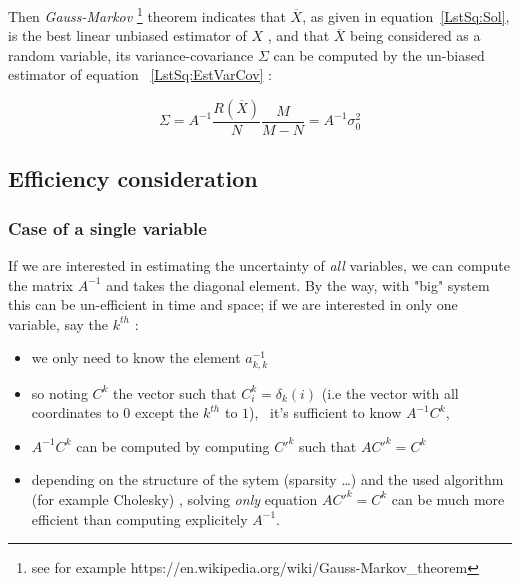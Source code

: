 Then \emph{Gauss-Markov} \footnote{see for example https://en.wikipedia.org/wiki/Gauss-Markov\_theorem}
theorem indicates that $\overline X$, as given in equation~\ref{LstSq:Sol}, is the 
best linear unbiased estimator of $X$ , and that $\overline X$ being considered as a random
variable, its variance-covariance $\Sigma$ can be computed by the un-biased estimator of
equation ~\ref{LstSq:EstVarCov} :

\begin{equation}
	\Sigma = A^{-1}  \frac{R(\overline X)}{N}  \frac{M}{M-N} = A^{-1} \sigma_0^2 \label{LstSq:EstVarCov}
\end{equation}

\subsection{Efficiency consideration}

\subsubsection{Case of a single variable}

If we are interested in estimating the uncertainty of \emph{all} variables, we can
compute the matrix $A^{-1}$ and takes the diagonal element. By the way, with "big"
system this can be un-efficient in time and space; if we are
interested in only one variable, say the $k^{th}$ :

\begin{itemize}
    \item  we only need to know the element $a^{-1}_{k,k}$
    \item  so noting $C^k$ the 
	   vector such that $C^k_i =\delta_k(i)$  (i.e the vector with all coordinates to $0$
           except  the $k^{th}$ to $1$), \ it's sufficient to know $A^{-1} C^k$,
    \item  $A^{-1} C^k$ can be  computed by computing $C'^k$ such that $A C'^k = C^k$
    \item  depending on the structure of the sytem (sparsity \dots) and the used
	    algorithm (for example Cholesky) , solving \emph{only} equation $A C'^k = C^k$
		can be much more efficient than computing explicitely $A^{-1}$.
\end{itemize}

